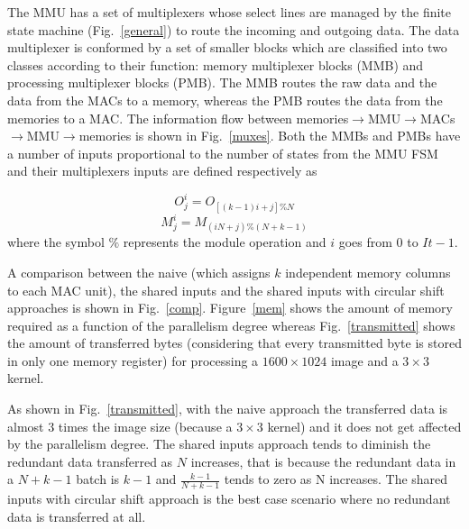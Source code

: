 \documentclass[conference,compsoc]{IEEEtran}
\begin{document}
The MMU has a set of multiplexers whose select lines are managed by the finite
state machine (Fig.~\ref{general}) to route the incoming and outgoing data. The
data multiplexer is conformed by a set of smaller blocks which are classified
into two classes according to their function: memory multiplexer blocks (MMB)
and processing multiplexer blocks (PMB). The MMB routes the raw data and the
data from the MACs to a memory, whereas the PMB routes the data from the memories
to a MAC. The information flow between
memories$\rightarrow$MMU$\rightarrow$MACs$\rightarrow$MMU$\rightarrow$memories
is shown in Fig.~\ref{muxes}. Both the MMBs and PMBs have a number of inputs
proportional to the number of states from the MMU FSM and their multiplexers
inputs are defined respectively as

\begin{equation}%
  O_j^i = O_{[(k-1)i+j]\%N}
\end{equation}
\begin{equation}%
  M_j^i = M_{(iN+j)\%(N+k-1)}
\end{equation}
where the symbol $\%$ represents the module operation and $i$ goes from $0$ to $It-1$.

A comparison between the naive (which assigns $k$ independent
memory columns to each MAC unit), the shared inputs and the
shared inputs with circular shift approaches is shown in Fig.~\ref{comp}.
Figure~\ref{mem} shows the amount of memory required as a function of the
parallelism degree whereas Fig.~\ref{transmitted} shows the amount of transferred
bytes (considering that every transmitted byte is stored in only one memory
register) for processing a $1600\times1024$ image and a $3\times3$ kernel.

As shown in Fig.~\ref{transmitted}, with the naive approach the transferred data is
almost $3$ times the image size (because a $3\times3$ kernel) and it does not
get affected by the parallelism degree. The shared inputs approach tends to
diminish the redundant data transferred as $N$ increases, that is because the
redundant data in a $N+k-1$ batch is $k-1$ and $\frac{k-1}{N+k-1}$ tends to zero
as N increases. The shared inputs with circular shift approach is the best case
scenario where no redundant data is transferred at all.

\end{document}
